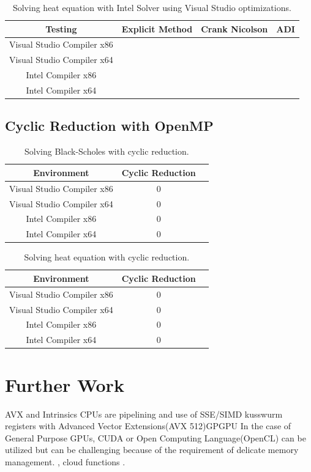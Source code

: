 \documentclass[12pt, oneside]{book}
\theoremstyle{plain}
\theoremstyle{definition}
\begin{document}
 
\begin{table}[htp!]
\centering
 \begin{tabular}{||c c c c||} 
 \hline
 Testing & Explicit Method & Crank Nicolson & ADI\\ [0.5ex] 
 \hline\hline\hline
 Visual Studio Compiler x86 \\ 
 Visual Studio Compiler x64 & \\
 Intel Compiler x86 & \\
 Intel Compiler x64 & \\[1ex] 
 \hline
 \end{tabular}
 \caption{Solving heat equation with Intel Solver using Visual Studio optimizations.}
\end{table}

\subsection{Cyclic Reduction with OpenMP} 
 
\begin{table}[h!]
\centering
 \begin{tabular}{||c c c||} 
 \hline
 Environment & Cyclic Reduction\\ [0.5ex] 
 \hline\hline\hline
 Visual Studio Compiler x86 & 0\\ 
 Visual Studio Compiler x64 & 0 \\
 Intel Compiler x86 & 0\\
 Intel Compiler x64 &0 \\ [1ex] 
 \hline
 \end{tabular}
 \caption{Solving Black-Scholes with cyclic reduction.}
\end{table}

\begin{table}[h!]
\centering
 \begin{tabular}{||c c c||} 
 \hline
 Environment & Cyclic Reduction\\ [0.5ex] 
 \hline\hline\hline
 Visual Studio Compiler x86 & 0\\ 
 Visual Studio Compiler x64 & 0 \\
 Intel Compiler x86 & 0\\
 Intel Compiler x64 &0 \\ [1ex] 
 \hline
 \end{tabular}
 \caption{Solving heat equation with cyclic reduction.}
\end{table}

\section{Further Work}
AVX and Intrinsics CPUs are pipelining and use of SSE/SIMD kusswurm registers with Advanced Vector Extensions(AVX 512)GPGPU In the case of General Purpose GPUs, CUDA or Open Computing Language(OpenCL) can be utilized but can be challenging because of the requirement of delicate memory management. \cite{fpga},  cloud functions \cite{cloudfunc}.
\end{document}
